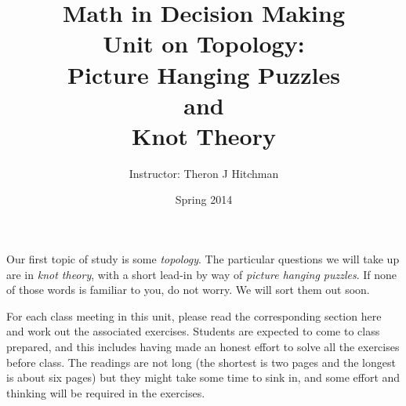 \documentclass[12pt]{article}
\begin{document}
\title{Math in Decision Making\\ Unit on Topology:\\ 
Picture Hanging Puzzles\\ and\\ Knot Theory}
\author{Instructor: Theron J Hitchman}
\date{Spring 2014}

\maketitle

Our first topic of study is some \emph{topology}. The particular questions we will take up are in \emph{knot theory}, with a short lead-in by way of \emph{picture hanging puzzles}. If none of those words is familiar to you, do not worry. We will sort them out soon.

For each class meeting in this unit, please read the corresponding section here and work out the associated exercises. Students are expected to come to class prepared, and this includes having made an honest effort to solve all the exercises before class. The readings are not long (the shortest is two pages and the longest is about six pages) but they might take some time to sink in, and some effort and thinking will be required in the exercises.

\newpage
$\phantom{Theron J Hitchman}$
\newpage



\newpage
$\phantom{Theron J Hitchman}$
\newpage

\newpage
$\phantom{Theron J Hitchman}$
\newpage



\newpage
$\phantom{Theron J Hitchman}$
\newpage

\newpage
$\phantom{Theron J Hitchman}$
\newpage

\newpage
$\phantom{Theron J Hitchman}$
\newpage



\end{document}
